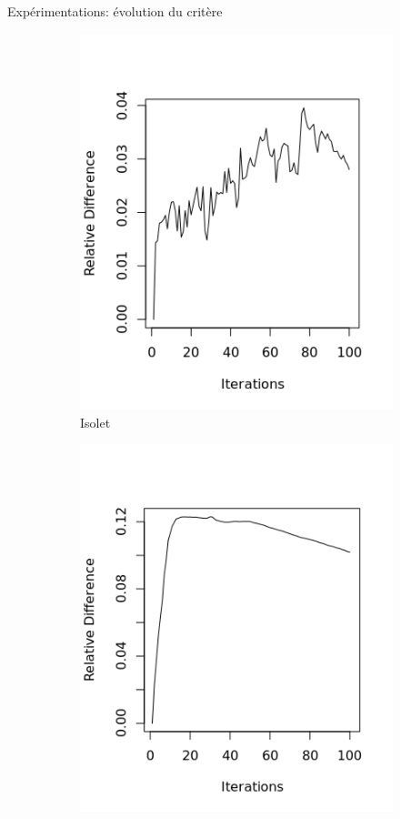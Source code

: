 \documentclass[hyperref={pdfpagelabels=false}]{beamer}
\begin{document}
\begin{frame}{Expérimentations: évolution du critère}
\begin{figure}[!h]
\begin{subfigure}[b]{0.32\textwidth}
                \includegraphics[width=1.0\textwidth]{isolet_RD2}
                \caption{Isolet}
            \end{subfigure}
            \begin{subfigure}[b]{0.32\textwidth}
                \centering
                \includegraphics[width=1.0\textwidth]{vhr_RD}

\end{subfigure}
\end{figure}
\end{frame}
\end{document}
